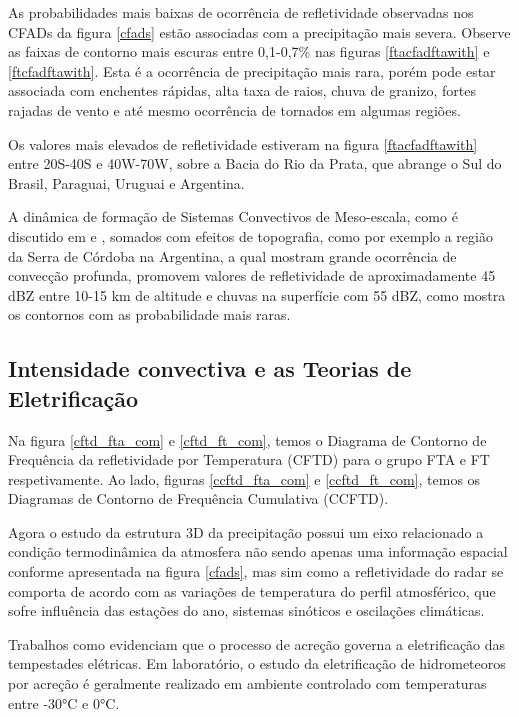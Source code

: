 \documentclass[preprint,authoryear,3p]{elsarticle}
\begin{document}
\begin{multicols}{2}
As probabilidades mais baixas de ocorrência de refletividade observadas nos CFADs da figura \ref{cfads} estão associadas com a precipitação mais severa. Observe as faixas de contorno mais escuras entre 0,1-0,7\% nas figuras \ref{ftacfadftawith} e \ref{ftcfadftawith}. Esta é a ocorrência de precipitação mais rara, porém pode estar associada com enchentes rápidas, alta taxa de raios, chuva de granizo, fortes rajadas de vento e até mesmo ocorrência de tornados em algumas regiões. 

Os valores mais elevados de refletividade estiveram na figura \ref{ftacfadftawith} entre 20S-40S e 40W-70W, sobre a Bacia do Rio da Prata, que abrange o Sul do Brasil, Paraguai, Uruguai e Argentina. 

A dinâmica de formação de Sistemas Convectivos de Meso-escala, como é discutido em \cite{Velasco1987} e \cite{Durkee2009}, somados com efeitos de topografia, como por exemplo a região da Serra de Córdoba na Argentina, a qual \cite{Rasmussen2011} mostram grande ocorrência de convecção profunda, promovem valores de refletividade de aproximadamente 45 dBZ entre 10-15 km de altitude e chuvas na superfície com 55 dBZ, como mostra os contornos com as probabilidade mais raras.


\subsection{Intensidade convectiva e as Teorias de Eletrificação}

Na figura \ref{cftd_fta_com} e \ref{cftd_ft_com}, temos o Diagrama de Contorno de Frequência da refletividade por Temperatura (CFTD) para o grupo FTA e FT respetivamente. Ao lado, figuras \ref{ccftd_fta_com} e \ref{ccftd_ft_com}, temos os Diagramas de Contorno de Frequência  Cumulativa (CCFTD). 



Agora o estudo da estrutura 3D da precipitação possui um eixo relacionado a condição termodinâmica da atmosfera não sendo apenas uma informação espacial conforme apresentada na figura \ref{cfads}, mas sim como a refletividade do radar se comporta de acordo com as variações de temperatura do perfil atmosférico, que sofre influência das estações do ano, sistemas sinóticos e oscilações climáticas.   

Trabalhos como \cite{Takahashi1978,Saunders1999}  evidenciam que o processo de acreção governa a eletrificação das tempestades elétricas. Em laboratório, o estudo da eletrificação de hidrometeoros por acreção é geralmente realizado em ambiente controlado com temperaturas entre -30°C e 0°C.


\end{multicols}
\end{document}
